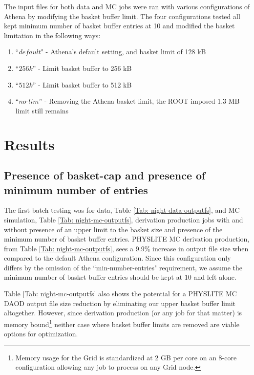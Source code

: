 The input files for both data and MC jobs were ran with various configurations of Athena by modifying the basket buffer limit. 
The four configurations tested all kept minimum number of basket buffer entries at 10 and modified the basket limitation in the following ways: 

\begin{enumerate}
    \item ``$\textit{default}$" - Athena's default setting, and basket limit of 128 kB
    \item ``$\textit{256k}$'' - Limit basket buffer to 256 kB
    \item ``$\textit{512k}$'' - Limit basket buffer to 512 kB
    \item ``$\textit{no-lim}$'' - Removing the Athena basket limit, the ROOT imposed 1.3 MB limit still remains
\end{enumerate}


\section{Results}
\label{sec:DAODProd_Results}

\subsection{Presence of basket-cap and presence of minimum number of entries}
\label{sec:DAODProd_Results_presence}

The first batch testing was for data, Table \ref{Tab: night-data-outputfs}, and MC simulation, Table \ref{Tab: night-mc-outputfs}, derivation production jobs with and without presence of an upper limit to the basket size and presence of the minimum number of basket buffer entries. 
PHYSLITE MC derivation production, from Table \ref{Tab: night-mc-outputfs}, sees a 9.9\% increase in output file size when compared to the default Athena configuration. 
Since this configuration only differs by the omission of the ``min-number-entries" requirement, we assume the minimum number of basket buffer entries should be kept at 10 and left alone. 

\vspace{15px}

\vspace{15px}
Table \ref{Tab: night-mc-outputfs} also shows the potential for a PHYSLITE MC DAOD output file size reduction by eliminating our upper basket buffer limit altogether.  
However, since derivation production (or any job for that matter) is memory bound\footnote{Memory usage for the Grid is standardized at 2 GB per core on an 8-core configuration allowing any job to process on any Grid node.} neither case where basket buffer limits are removed are viable options for optimization. 

